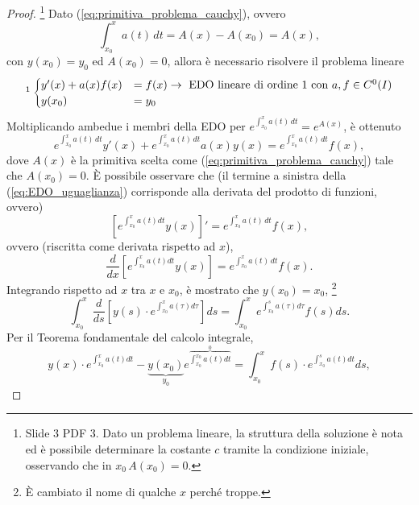\begin{proof}
	\footnote{Slide 3 PDF 3. Dato un problema lineare, la struttura della soluzione è nota ed è possibile determinare la costante $c$ tramite la condizione iniziale, osservando che in $x_0\, A(x_0)=0$.}
	Dato (\ref{eq:primitiva_problema_cauchy}), ovvero 
	\begin{equation}
		\int_{x_0}^{x} a(t)\, dt = A(x) - A(x_0) = A(x),
	\end{equation}
	con $y(x_0)=y_0$ ed $A(x_0)=0$, allora è necessario risolvere il problema lineare
	\begin{equation*}\footnotemark
		\begin{cases}
			y'(x) + a(x)f(x)&=f(x) \rightarrow \text{ EDO lineare di ordine 1 con $a,f\in C^0(I)$}\\
			y(x_0)&=y_0
		\end{cases}
	\end{equation*}
	Moltiplicando ambedue i membri della EDO per $e^{\int_{x_0}^x a(t)\, dt}=e^{A(x)}$, è ottenuto
	\begin{equation}\label{eq:EDO_uguaglianza}
		e^{\int_{x_0}^x a(t)\, dt} y'(x) + e^{\int_{x_0}^x a(t)\, dt} a(x)y(x)=e^{\int_{x_0}^x a(t)\, dt} f(x),
	\end{equation}
	dove $A(x)$ è la primitiva scelta come (\ref{eq:primitiva_problema_cauchy}) tale che $A(x_0)=0$. È possibile osservare che (il termine a sinistra della (\ref{eq:EDO_uguaglianza}) corrisponde alla derivata del prodotto di funzioni, ovvero)
	\begin{equation*}
		\left[e^{\int_{x_0}^x a(t) dt} y(x)\right]' = e^{\int_{x_0}^x a(t)\, dt} f(x),
	\end{equation*}
	ovvero (riscritta come derivata rispetto ad $x$),
	\begin{equation*}
		\frac{d}{dx}\left[e^{\int_{x_0}^x a(t) dt} y(x)\right] = e^{\int_{x_0}^x a(t)\, dt} f(x).
	\end{equation*}
	Integrando rispetto ad $x$ tra $x$ e $x_0$, è mostrato che $y(x_0)=x_0$, \footnote{È cambiato il nome di qualche $x$ perché troppe.}
	\begin{equation*}
		\int_{x_0}^x\frac{d}{ds}\left[y(s)\cdot e^{\int_{x_0}^x a(\tau) d\tau}\right]ds=\int_{x_0}^x e^{\int_{x_0}^s a(\tau)d\tau} f(s) ds.
	\end{equation*}
	Per il Teorema fondamentale del calcolo integrale,
	\begin{equation*}
		y(x)\cdot e^{\int_{x_0}^xa(t)dt}-\underbrace{y(x_0)}_{y_0} e^{\overbrace{\int_{x_0}^{x_0}a(t)dt}^{0}}=\int_{x_0}^x f(s)\cdot e^{\int_{x_0}^sa(t)dt}ds,

\end{equation*}
\end{proof}
